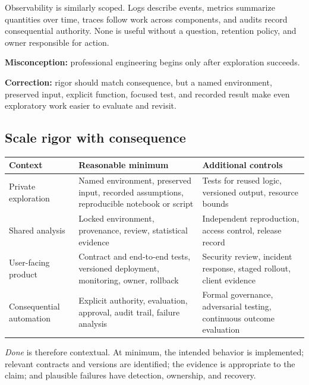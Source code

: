 Observability is similarly scoped. Logs describe events, metrics summarize
quantities over time, traces follow work across components, and audits record
consequential authority. None is useful without a question, retention policy,
and owner responsible for action.

\begin{misconceptionbox}
\textbf{Misconception:} professional engineering begins only after exploration
succeeds.

\textbf{Correction:} rigor should match consequence, but a named environment,
preserved input, explicit function, focused test, and recorded result make even
exploratory work easier to evaluate and revisit.
\end{misconceptionbox}

\subsection{Scale rigor with consequence}

\begin{center}
\small
\begin{tabularx}{\textwidth}{@{}
  >{\raggedright\arraybackslash}p{}
  >{\raggedright\arraybackslash}X
  >{\raggedright\arraybackslash}X@{}}
\toprule
\textbf{Context} & \textbf{Reasonable minimum} & \textbf{Additional controls} \\
\midrule
Private exploration & Named environment, preserved input, recorded assumptions,
reproducible notebook or script & Tests for reused logic, versioned output,
resource bounds \\
Shared analysis & Locked environment, provenance, review, statistical evidence &
Independent reproduction, access control, release record \\
User-facing product & Contract and end-to-end tests, versioned deployment,
monitoring, owner, rollback & Security review, incident response, staged
rollout, client evidence \\
Consequential automation & Explicit authority, evaluation, approval, audit
trail, failure analysis & Formal governance, adversarial testing, continuous
outcome evaluation \\
\bottomrule
\end{tabularx}
\end{center}

\emph{Done} is therefore contextual. At minimum, the intended behavior is
implemented; relevant contracts and versions are identified; the evidence is
appropriate to the claim; and plausible failures have detection, ownership,
and recovery.

